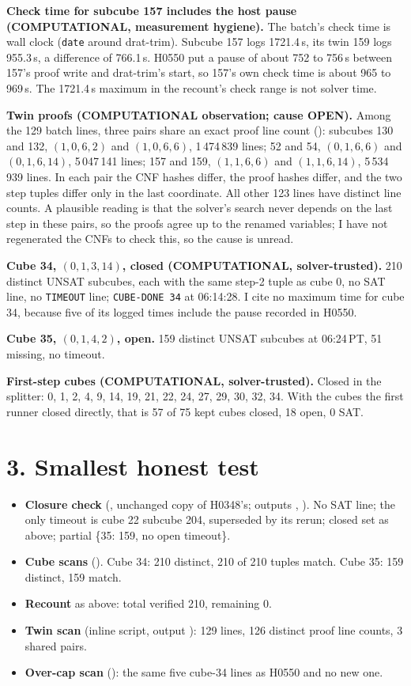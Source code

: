 \documentclass[11pt]{article}
\begin{document}
\textbf{Check time for subcube 157 includes the host pause (COMPUTATIONAL, measurement hygiene).} The batch's check time is wall clock (\texttt{date} around drat-trim). Subcube 157 logs 1721.4\,s, its twin 159 logs 955.3\,s, a difference of 766.1\,s. H0550 put a pause of about 752 to 756\,s between 157's proof write and drat-trim's start, so 157's own check time is about 965 to 969\,s. The 1721.4\,s maximum in the recount's check range is not solver time.

\textbf{Twin proofs (COMPUTATIONAL observation; cause OPEN).} Among the 129 batch lines, three pairs share an exact proof line count (): subcubes 130 and 132, $(1,0,6,2)$ and $(1,0,6,6)$, 1\,474\,839 lines; 52 and 54, $(0,1,6,6)$ and $(0,1,6,14)$, 5\,047\,141 lines; 157 and 159, $(1,1,6,6)$ and $(1,1,6,14)$, 5\,534\,939 lines. In each pair the CNF hashes differ, the proof hashes differ, and the two step tuples differ only in the last coordinate. All other 123 lines have distinct line counts. A plausible reading is that the solver's search never depends on the last step in these pairs, so the proofs agree up to the renamed variables; I have not regenerated the CNFs to check this, so the cause is unread.

\textbf{Cube 34, $(0,1,3,14)$, closed (COMPUTATIONAL, solver-trusted).} 210 distinct UNSAT subcubes, each with the same step-2 tuple as cube 0, no SAT line, no \texttt{TIMEOUT} line; \texttt{CUBE-DONE 34} at 06:14:28. I cite no maximum time for cube 34, because five of its logged times include the pause recorded in H0550.

\textbf{Cube 35, $(0,1,4,2)$, open.} 159 distinct UNSAT subcubes at 06:24\,PT, 51 missing, no timeout.

\textbf{First-step cubes (COMPUTATIONAL, solver-trusted).} Closed in the splitter: 0, 1, 2, 4, 9, 14, 19, 21, 22, 24, 27, 29, 30, 32, 34. With the cubes the first runner closed directly, that is 57 of 75 kept cubes closed, 18 open, 0 SAT.

\section*{3. Smallest honest test}
\begin{itemize}
\item \textbf{Closure check} (, unchanged copy of H0348's; outputs , ). No SAT line; the only timeout is cube 22 subcube 204, superseded by its rerun; closed set as above; partial \{35: 159, no open timeout\}.
\item \textbf{Cube scans} (). Cube 34: 210 distinct, 210 of 210 tuples match. Cube 35: 159 distinct, 159 match.
\item \textbf{Recount} as above: total verified 210, remaining 0.
\item \textbf{Twin scan} (inline script, output ): 129 lines, 126 distinct proof line counts, 3 shared pairs.
\item \textbf{Over-cap scan} (): the same five cube-34 lines as H0550 and no new one.
\end{itemize}
\end{document}
